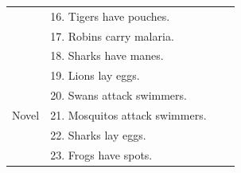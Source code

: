 \documentclass[10pt,letterpaper]{article}
\begin{document}
\begin{table}[h]
\begin{tabular}{| l || l | l | l |}
                                              & 16.  Tigers have pouches.                       &                &                     \\
                                              & 17.  Robins carry malaria.                       &                &                     \\
                                              & 18. Sharks have manes.                       &                &                     \\
                                              & 19. Lions lay eggs.                       &                &                     \\
                                              & 20. Swans attack swimmers.                       &                &                     \\
Novel                         & 21. Mosquitos attack swimmers.       &                &                    \\
                         & 22. Sharks lay eggs.       &                &                    \\
                         & 23. Frogs have spots.       &                &                   \\
\hline

\end{tabular}
\end{table}





\setlength{\bibleftmargin}{.125in}
\setlength{\bibindent}{-\bibleftmargin}


\end{document}
